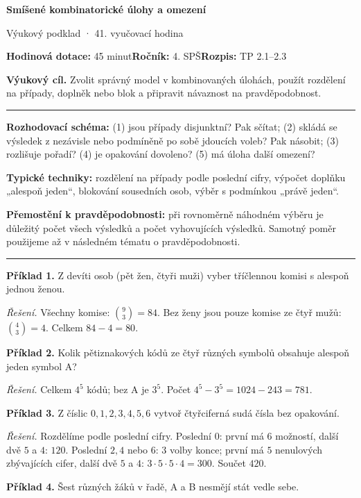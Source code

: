 \documentclass[11pt,a4paper]{article}
\newcommand{\sect}[1]{\par\vspace{2mm}{\Large\sffamily\bfseries\color{deep} #1}\par\vspace{-0.5mm}\noindent\color{teal}\rule{\linewidth}{0.7pt}\color{black}\vspace{1mm}}
\begin{document}
{\Huge\sffamily\bfseries\color{deep} Smíšené kombinatorické úlohy a omezení}\par
{\sffamily\large\color{teal} Výukový podklad · 41. vyučovací hodina}\par
\textbf{Hodinová dotace:} 45 minut\quad \textbf{Ročník:} 4. SPŠ\quad \textbf{Rozpis:} TP 2.1–2.3\par
\begin{tcolorbox}[theobox]\textbf{Výukový cíl.} Zvolit správný model v kombinovaných úlohách, použít rozdělení na případy, doplněk nebo blok a připravit návaznost na pravděpodobnost.\end{tcolorbox}
\sect{Teorie a vysvětlení}
\textbf{Rozhodovací schéma:} (1) jsou případy disjunktní? Pak sčítat; (2) skládá se výsledek z nezávisle nebo podmíněně po sobě jdoucích voleb? Pak násobit; (3) rozlišuje pořadí? (4) je opakování dovoleno? (5) má úloha další omezení?\par
\textbf{Typické techniky:} rozdělení na případy podle poslední cifry, výpočet doplňku „alespoň jeden“, blokování sousedních osob, výběr s podmínkou „právě jeden“.\par
\textbf{Přemostění k pravděpodobnosti:} při rovnoměrně náhodném výběru je důležitý počet všech výsledků a počet vyhovujících výsledků. Samotný poměr použijeme až v následném tématu o pravděpodobnosti.
\sect{Řešené příklady}
\textbf{Příklad 1.} Z devíti osob (pět žen, čtyři muži) vyber tříčlennou komisi s alespoň jednou ženou.\par
\textit{Řešení.} Všechny komise: \(\binom93=84\). Bez ženy jsou pouze komise ze čtyř mužů: \(\binom43=4\). Celkem \(84-4=80\).\par\smallskip
\textbf{Příklad 2.} Kolik pětiznakových kódů ze čtyř různých symbolů obsahuje alespoň jeden symbol A?\par
\textit{Řešení.} Celkem \(4^5\) kódů; bez A je \(3^5\). Počet \(4^5-3^5=1024-243=781\).\par\smallskip
\textbf{Příklad 3.} Z číslic \(0,1,2,3,4,5,6\) vytvoř čtyřciferná sudá čísla bez opakování.\par
\textit{Řešení.} Rozdělíme podle poslední cifry. Poslední \(0\): první má \(6\) možností, další dvě \(5\) a \(4\): \(120\). Poslední \(2,4\) nebo \(6\): \(3\) volby konce; první má \(5\) nenulových zbývajících cifer, další dvě \(5\) a \(4\): \(3\cdot5\cdot5\cdot4=300\). Součet \(420\).\par\smallskip
\textbf{Příklad 4.} Šest různých žáků v řadě, A a B nesmějí stát vedle sebe.\par
\end{document}
